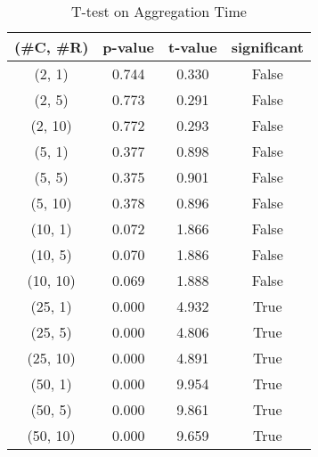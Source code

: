\begin{table}[h]
\centering
\caption{T-test on Aggregation Time}
\label{tab:t-testAggregating}
\begin{tabular}{|c|c|c|c|}
\toprule
(\#C, \#R) &  p-value &  t-value &  significant \\
\midrule
  (2, 1) &    0.744 &    0.330 &        False \\
  (2, 5) &    0.773 &    0.291 &        False \\
 (2, 10) &    0.772 &    0.293 &        False \\
  (5, 1) &    0.377 &    0.898 &        False \\
  (5, 5) &    0.375 &    0.901 &        False \\
 (5, 10) &    0.378 &    0.896 &        False \\
 (10, 1) &    0.072 &    1.866 &        False \\
 (10, 5) &    0.070 &    1.886 &        False \\
(10, 10) &    0.069 &    1.888 &        False \\
 (25, 1) &    0.000 &    4.932 &         True \\
 (25, 5) &    0.000 &    4.806 &         True \\
(25, 10) &    0.000 &    4.891 &         True \\
 (50, 1) &    0.000 &    9.954 &         True \\
 (50, 5) &    0.000 &    9.861 &         True \\
(50, 10) &    0.000 &    9.659 &         True \\
\bottomrule
\end{tabular}
\end{table}
